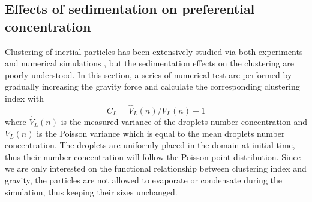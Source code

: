 \documentclass[draft,jgrga]{AGUTeX}
\begin{document}
\begin{article}
\section{Effects of sedimentation on preferential concentration }
Clustering of inertial particles has been extensively studied via both 
experiments and numerical simulations \cite{Sundaram97, Reade2000}, but the sedimentation effects on the clustering are poorly understood. In this section, a series of numerical test are performed by gradually increasing the gravity force and calculate the corresponding clustering index \cite{Vaillancourt02} with
\begin{equation}
C_L = \hat{V}_L(n)/V_L(n)-1
\label{eq:cluster_index}
\end{equation}
where $\hat{V}_L(n)$ is the measured variance of the droplets number concentration and $V_L(n)$ is the Poisson variance which is equal to the mean droplets number concentration.
The droplets are uniformly placed in the domain at initial time, thus their number concentration will follow the Poisson point distribution. Since we are only interested on the functional relationship between clustering index and gravity, the particles are not allowed to evaporate or condensate during the simulation, thus keeping their sizes unchanged.


\end{article}
\end{document}
